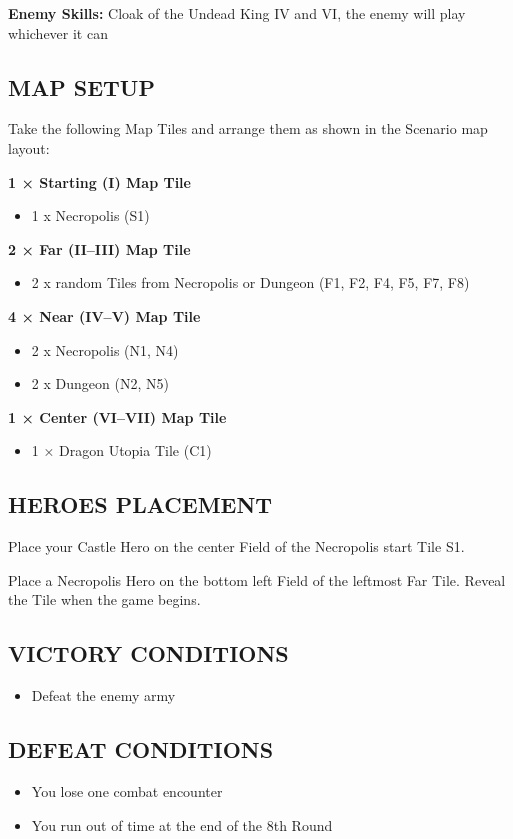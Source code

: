 \begin{multicols*}{2}
\textbf{Enemy Skills:} Cloak of the Undead King IV and VI, the enemy will play whichever it can

\subsection*{\MakeUppercase{Map setup}}

Take the following Map Tiles and arrange them as shown in the Scenario map layout:

\textbf{1 × Starting (I) Map Tile}
\begin{itemize}
    \item 1 x Necropolis (S1)
\end{itemize}

\textbf{2 × Far (II--III) Map Tile}
\begin{itemize}
    \item 2 x random Tiles from Necropolis or Dungeon (F1, F2, F4, F5, F7, F8)
\end{itemize}

\textbf{4 × Near (IV--V) Map Tile}
\begin{itemize}
    \item 2 x Necropolis (N1, N4)
    \item 2 x Dungeon (N2, N5)
\end{itemize}

\textbf{1 × Center (VI--VII) Map Tile}
\begin{itemize}
  \item 1 × Dragon Utopia Tile (C1)
\end{itemize}

\subsection*{\MakeUppercase{Heroes placement}}

Place your Castle Hero on the center Field of the Necropolis start Tile S1.

Place a Necropolis Hero on the bottom left Field of the leftmost Far Tile.
Reveal the Tile when the game begins.

\subsection*{\MakeUppercase{Victory Conditions}}

\begin{itemize}
  \item Defeat the enemy army
\end{itemize}


\subsection*{\MakeUppercase{Defeat Conditions}}
\begin{itemize}
  \item You lose one combat encounter
  \item You run out of time at the end of the 8th Round
\end{itemize}
\end{multicols*}

